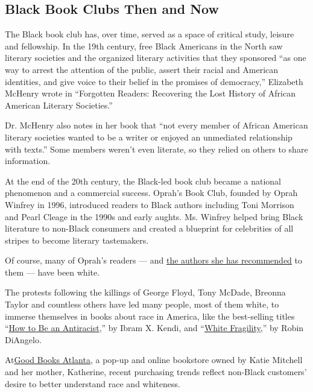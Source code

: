 \hypertarget{black-book-clubs-then-and-now}{%
\subsection{Black Book Clubs Then and
Now}\label{black-book-clubs-then-and-now}}

The Black book club has, over time, served as a space of critical study,
leisure and fellowship. In the 19th century, free Black Americans in the
North saw literary societies and the organized literary activities that
they sponsored ``as one way to arrest the attention of the public,
assert their racial and American identities, and give voice to their
belief in the promises of democracy,'' Elizabeth McHenry wrote in
``Forgotten Readers: Recovering the Lost History of African American
Literary Societies.''

Dr. McHenry also notes in her book that ``not every member of African
American literary societies wanted to be a writer or enjoyed an
unmediated relationship with texts.'' Some members weren't even
literate, so they relied on others to share information.

At the end of the 20th century, the Black-led book club became a
national phenomenon and a commercial success. Oprah's Book Club, founded
by Oprah Winfrey in 1996, introduced readers to Black authors including
Toni Morrison and Pearl Cleage in the 1990s and early aughts. Ms.
Winfrey helped bring Black literature to non-Black consumers and created
a blueprint for celebrities of all stripes to become literary
tastemakers.

Of course, many of Oprah's readers --- and
\href{https://www.oprahmag.com/entertainment/books/g23067476/oprah-book-club-list/}{the
authors she has recommended} to them --- have been white.

The protests following the killings of George Floyd, Tony McDade,
Breonna Taylor and countless others have led many people, most of them
white, to immerse themselves in books about race in America, like the
best-selling titles
``\href{https://bookshop.org/books/how-to-be-an-antiracist-9780593396803/9780593396803}{How
to Be an Antiracist},'' by Ibram X. Kendi, and
``\href{https://www.nytimes.com/2020/07/15/magazine/white-fragility-robin-diangelo.html}{White
Fragility,}'' by Robin DiAngelo.

At\href{https://www.goodbooksatl.com/}{Good Books Atlanta}, a pop-up and
online bookstore owned by Katie Mitchell and her mother, Katherine,
recent purchasing trends reflect non-Black customers' desire to better
understand race and whiteness.

